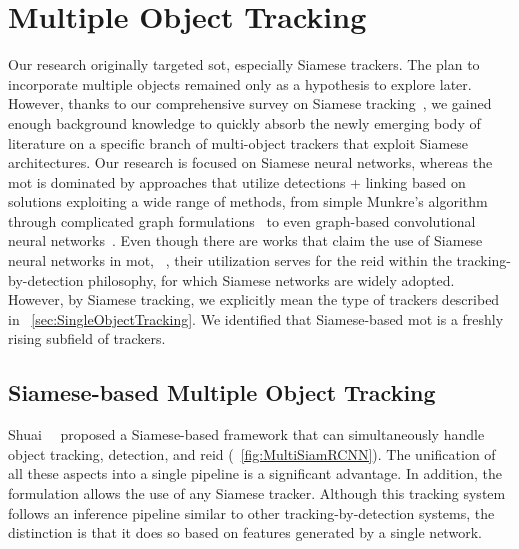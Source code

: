 \section{Multiple Object Tracking}
\label{sec:MultipleObjectTracking}

Our research originally targeted \gls{sot}, especially Siamese trackers. The plan to incorporate multiple objects remained only as a hypothesis to explore later. However, thanks to our comprehensive survey on Siamese tracking~\cite{ondrasovic2021siamese}, we gained enough background knowledge to quickly absorb the newly emerging body of literature on a specific branch of multi-object trackers that exploit Siamese architectures. Our research is focused on Siamese neural networks, whereas the \gls{mot} is dominated by approaches that utilize detections + linking based on solutions exploiting a wide range of methods, from simple Munkre's algorithm~\cite{munkres1957assignment} through complicated graph formulations~\cite{chen2001motdynamicgraph} to even graph-based convolutional neural networks~\cite{papakis2021gcnnmatch}. Even though there are works that claim the use of Siamese neural networks in \gls{mot}, \egtext{}~\cite{cuan2018deepsiammot}, their utilization serves for the \gls{reid} within the tracking-by-detection philosophy, for which Siamese networks are widely adopted. However, by Siamese tracking, we explicitly mean the type of trackers described in \sectiontext{}~\ref{sec:SingleObjectTracking}. We identified that Siamese-based \gls{mot} is a freshly rising subfield of trackers.

\subsection{Siamese-based Multiple Object Tracking}
\label{ssec:SiameseBasedMultipleObjectTracking}

Shuai~\etal{}~\cite{shuai2020multisiamrcnn} proposed a Siamese-based framework that can simultaneously handle object tracking, detection, and \gls{reid} (\figtext{}~\ref{fig:MultiSiamRCNN}). The unification of all these aspects into a single pipeline is a significant advantage. In addition, the formulation allows the use of any Siamese tracker. Although this tracking system follows an inference pipeline similar to other tracking-by-detection systems, the distinction is that it does so based on features generated by a single network.

